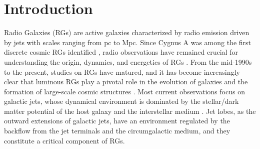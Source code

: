 \documentclass{aa}
\begin{document}
  


   \maketitle

   
\section{Introduction}\label{sec:Introduction}
Radio Galaxies (RGs) are active galaxies characterized by radio emission driven by jets with scales ranging from pc to Mpc. Since Cygnus A was among the first discrete cosmic RGs identified \citep{hey_fluctuations_1946}, radio observations have remained crucial for understanding the origin, dynamics, and energetics of RGs \citep{hardcastle_radio_2020}. From the mid-1990s to the present, studies on RGs have matured, and it has become increasingly clear that luminous RGs play a pivotal role in the evolution of galaxies and the formation of large-scale cosmic structures \citep{miley_distant_2008}. Most current observations focus on galactic jets, whose dynamical environment is dominated by the stellar/dark matter potential of the host galaxy and the interstellar medium \citep{blandford_relativistic_2019}. Jet lobes, as the outward extensions of galactic jets, have an environment regulated by the backflow from the jet terminals and the circumgalactic medium, and they constitute a critical component of RGs.
\end{document}

